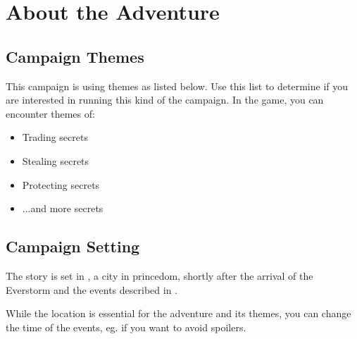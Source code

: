\section{About the Adventure}


\subsection{Campaign Themes}

This campaign is using themes as listed below. Use this list to determine if you are interested in running this kind of the campaign. In the game, you can encounter themes of:
\begin{itemize}
	\item Trading secrets
	\item Stealing secrets
	\item Protecting secrets
	\item ...and more secrets
\end{itemize}

\subsection{Campaign Setting}

The story is set in \locationYeddaw{}, a city in \locationTashikk{} princedom, shortly after the arrival of the Everstorm and the events described in \bookED{}.

While the location is essential for the adventure and its themes, you can change the time of the events, eg. if you want to avoid \bookSA{} spoilers.
